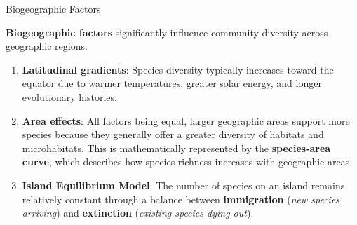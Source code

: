 \documentclass[10pt]{article}
\begin{document}
    \begin{core}{Biogeographic Factors}

      \textbf{Biogeographic factors} significantly influence community diversity across geographic regions.

      \begin{enumerate}

        \item \textbf{Latitudinal gradients}: Species diversity typically increases toward the equator due to warmer temperatures, greater solar energy, and longer evolutionary histories. 

        \item \textbf{Area effects}: All factors being equal, larger geographic areas support more species because they generally offer a greater diversity of habitats and microhabitats. This is mathematically represented by the \textbf{species-area curve}, which describes how species richness increases with geographic areas.


        \item \textbf{Island Equilibrium Model}: The number of species on an island remains relatively constant through a balance between \textbf{immigration} (\textit{new species arriving}) and \textbf{extinction} (\textit{existing species dying out}).

      \end{enumerate}

    \end{core}
\end{document}
